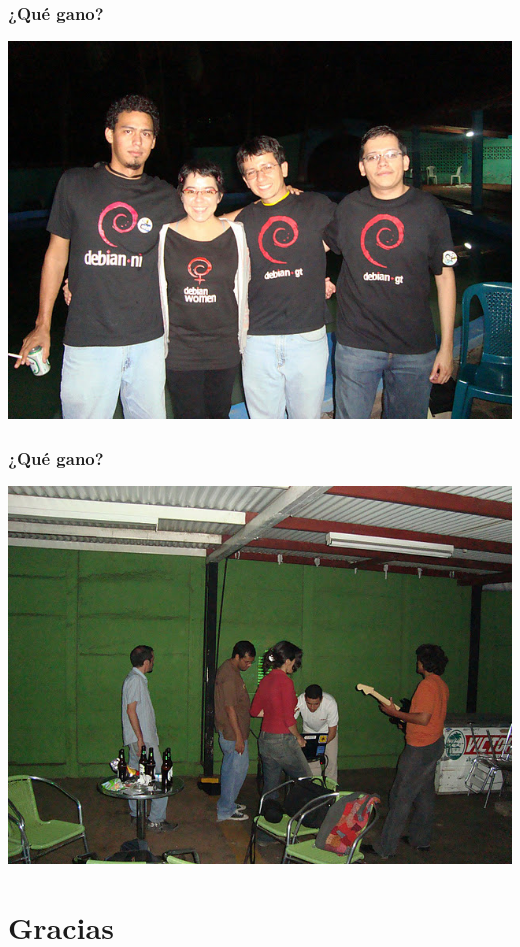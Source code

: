 \documentclass{beamer}
\begin{document}
\begin{frame}
\frametitle{¿Qu\'e gano?}
	\begin{center}
                 \includegraphics[scale=0.30]{../img/DSC03610.JPG}
	\end{center}
\end{frame}


\begin{frame}
\frametitle{¿Qu\'e gano?}
	\begin{center}
                 \includegraphics[scale=0.30]{../img/dsc04738.jpg}
	\end{center}
\end{frame}
\section{Gracias}
\end{document}
